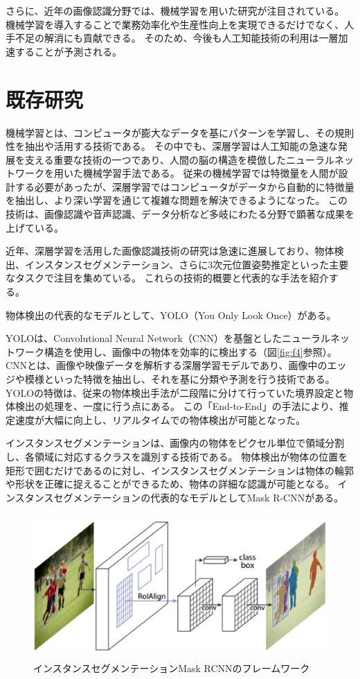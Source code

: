 さらに、近年の画像認識分野では、機械学習を用いた研究が注目されている。
機械学習を導入することで業務効率化や生産性向上を実現できるだけでなく、人手不足の解消にも貢献できる。
そのため、今後も人工知能技術の利用は一層加速することが予測される。



\section{既存研究}
機械学習とは、コンピュータが膨大なデータを基にパターンを学習し、その規則性を抽出や活用する技術である。
その中でも、深層学習は人工知能の急速な発展を支える重要な技術の一つであり、人間の脳の構造を模倣したニューラルネットワークを用いた機械学習手法である。
従来の機械学習では特徴量を人間が設計する必要があったが、深層学習ではコンピュータがデータから自動的に特徴量を抽出し、より深い学習を通じて複雑な問題を解決できるようになった。
この技術は、画像認識や音声認識、データ分析など多岐にわたる分野で顕著な成果を上げている。

近年、深層学習を活用した画像認識技術の研究は急速に進展しており、物体検出、インスタンスセグメンテーション、さらに3次元位置姿勢推定といった主要なタスクで注目を集めている。
これらの技術的概要と代表的な手法を紹介する。

物体検出の代表的なモデルとして、YOLO（You Only Look Once）がある。

YOLOは、Convolutional Neural Network（CNN）を基盤としたニューラルネットワーク構造を使用し、画像中の物体を効率的に検出する（図\ref{fig:f4}参照）。
CNNとは、画像や映像データを解析する深層学習モデルであり、画像中のエッジや模様といった特徴を抽出し、それを基に分類や予測を行う技術である。
YOLOの特徴は、従来の物体検出手法が二段階に分けて行っていた境界設定と物体検出の処理を、一度に行う点にある。
この「End-to-End」の手法により、推定速度が大幅に向上し、リアルタイムでの物体検出が可能となった。


インスタンスセグメンテーションは、画像内の物体をピクセル単位で領域分割し、各領域に対応するクラスを識別する技術である。
物体検出が物体の位置を矩形で囲むだけであるのに対し、インスタンスセグメンテーションは物体の輪郭や形状を正確に捉えることができるため、物体の詳細な認識が可能となる。
インスタンスセグメンテーションの代表的なモデルとしてMask R-CNNがある。
\begin{figure}[htbt]
	\centering
	 \includegraphics[height=55mm]{Figure/Mask-RCNN.eps}
	 \caption{インスタンスセグメンテーションMask RCNNのフレームワーク}
	 \label{fig:f5}
\end{figure}

